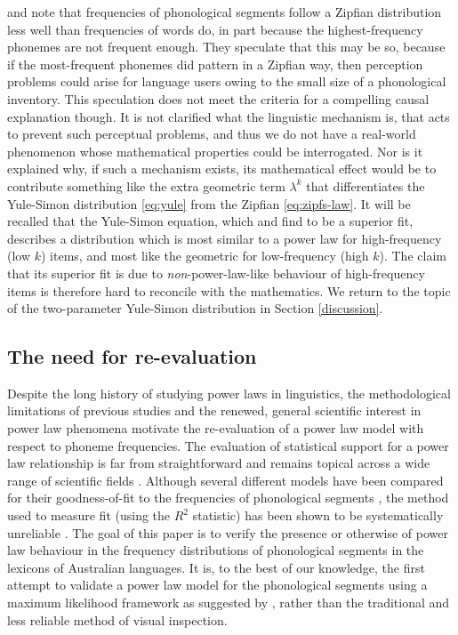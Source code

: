 \textcite[p.~111]{martindale_comparison_1996} and \textcite[p.~9]{tambovtsev_phoneme_2007} note that frequencies of phonological segments follow a Zipfian distribution less well than frequencies of words do, in part because the highest-frequency phonemes are not frequent enough. They speculate that this may be so, because if the most-frequent phonemes did pattern in a Zipfian way, then perception problems could arise for language users owing to the small size of a phonological inventory. This speculation does not meet the criteria for a compelling causal explanation though. It is not clarified what the linguistic mechanism is, that acts to prevent such perceptual problems, and thus we do not have a real-world phenomenon whose mathematical properties could be interrogated. Nor is it explained why, if such a mechanism exists, its mathematical effect would be to contribute something like the extra geometric term \(\lambda^k\) that differentiates the Yule-Simon distribution \eqref{eq:yule} from the Zipfian \eqref{eq:zipfs-law}. It will be recalled that the Yule-Simon equation, which \textcite{martindale_comparison_1996} and \textcite{tambovtsev_phoneme_2007} find to be a superior fit, describes a distribution which is most similar to a power law for high-frequency (low \(k\)) items, and most like the geometric for low-frequency (high \(k\)). The claim that its superior fit is due to \emph{non}-power-law-like behaviour of high-frequency items is therefore hard to reconcile with the mathematics. We return to the topic of the two-parameter Yule-Simon distribution in Section \ref{discussion}.

\hypertarget{the-need-for-re-evaluation}{%
\subsection{The need for re-evaluation}\label{the-need-for-re-evaluation}}

Despite the long history of studying power laws in linguistics, the methodological limitations of previous studies and the renewed, general scientific interest in power law phenomena motivate the re-evaluation of a power law model with respect to phoneme frequencies. The evaluation of statistical support for a power law relationship is far from straightforward and remains topical across a wide range of scientific fields \autocite{stumpf_critical_2012}. Although several different models have been compared for their goodness-of-fit to the frequencies of phonological segments \autocites{martindale_comparison_1996}{tambovtsev_phoneme_2007}, the method used to measure fit (using the \(R^2\) statistic) has been shown to be systematically unreliable \autocite{clauset_power-law_2009}. The goal of this paper is to verify the presence or otherwise of power law behaviour in the frequency distributions of phonological segments in the lexicons of Australian languages. It is, to the best of our knowledge, the first attempt to validate a power law model for the phonological segments using a maximum likelihood framework as suggested by \textcite{clauset_power-law_2009}, rather than the traditional and less reliable method of visual inspection.


